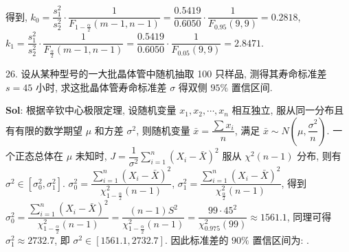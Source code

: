 得到, $k_0=\dfrac{s_1^2}{s_2^2}\cdot\dfrac{1}{F_{1-\frac{\alpha}{2}}(m-1,n-1)}=\dfrac{0.5419}{0.6050}\cdot\dfrac{1}{F_{0.95}(9,9)}=0.2818$, $k_1=\dfrac{s_1^2}{s_2^2}\cdot\dfrac{1}{F_{\frac{\alpha}{2}}(m-1,n-1)}=\dfrac{0.5419}{0.6050}\cdot\dfrac{1}{F_{0.05}(9,9)}=2.8471$.

\mymathbox{[0.2818,2.8471]}

\vspace{12pt}

26. 设从某种型号的一大批晶体管中随机抽取 100 只样品, 测得其寿命标准差 $s=45$ 小时, 求这批晶体管寿命标准差 $\sigma$ 得双侧 $95\%$ 置信区间.

\textbf{Sol}: 根据辛钦中心极限定理, 设随机变量 $x_1,x_2,\cdots,x_n$ 相互独立, 服从同一分布且有有限的数学期望 $\mu$ 和方差 $\sigma^2$, 
则随机变量 $\bar{x}=\dfrac{\sum x_i}{n}$, 满足 $\bar{x}\sim N(\mu,\dfrac{\sigma^2}{n})$. 一个正态总体在 $\mu$ 未知时, 
$J=\dfrac{1}{\sigma^2}\sum_{i=1}^n(X_i-\bar{X})^2$ 服从 $\chi^2(n-1)$ 分布, 则有 $\sigma^2\in[\sigma_0^2,\sigma_1^2]$. $\sigma_0^2=\dfrac{\sum_{i=1}^n(X_i-\bar{X})^2}{\chi_{1-\frac{\alpha}{2}}^2(n-1)}$, $\sigma_1^2=\dfrac{\sum_{i=1}^n(X_i-\bar{X})^2}{\chi_{\frac{\alpha}{2}}^2(n-1)}$, 得到 $\sigma_0^2=\dfrac{\sum_{i=1}^n(X_i-\bar{X})^2}{\chi_{1-\frac{\alpha}{2}}^2(n-1)}=\dfrac{(n-1)S^2}{\chi_{1-\frac{\alpha}{2}}^2(n-1)}=\dfrac{99\cdot45^2}{\chi^2_{0.975}(99)}\approx1561.1$, 同理可得 $\sigma_1^2\approx2732.7$, 即 $\sigma^2\in[1561.1, 2732.7]$. 
因此标准差的 $90\%$ 置信区间为:  \mymathbox{\sigma\in[39.51, 52.28]}.


\vspace{12pt}


